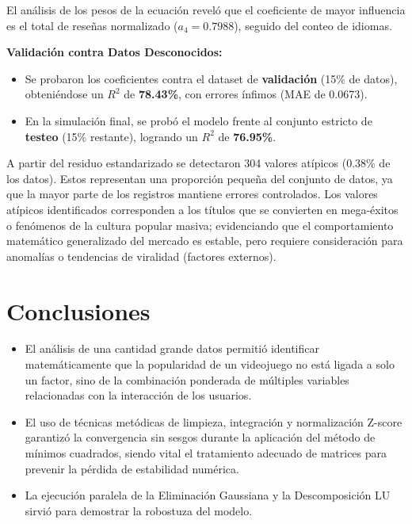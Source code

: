 \documentclass[12pt]{report}
\begin{document}
El análisis de los pesos de la ecuación reveló que el coeficiente de mayor influencia es el total de reseñas normalizado ($a_4 = 0.7988$), seguido del conteo de idiomas.

\textbf{Validación contra Datos Desconocidos:}
\begin{itemize}
    \item Se probaron los coeficientes contra el dataset de \textbf{validación} (15\% de datos), obteniéndose un $R^2$ de \textbf{78.43\%}, con errores ínfimos (MAE de 0.0673).
    \item En la simulación final, se probó el modelo frente al conjunto estricto de \textbf{testeo} (15\% restante), logrando un $R^2$ de \textbf{76.95\%}.
\end{itemize}

A partir del residuo estandarizado se detectaron 304 valores atípicos (0.38\% de los datos). Estos representan una proporción pequeña del conjunto de datos, ya que la mayor parte de los registros mantiene errores controlados. Los valores atípicos identificados corresponden a los títulos que se convierten en mega-éxitos o fenómenos de la cultura popular masiva; evidenciando que el comportamiento matemático generalizado del mercado es estable, pero requiere consideración para anomalías o tendencias de viralidad (factores externos).


\section*{Conclusiones}
\begin{itemize}
    \item El análisis de una cantidad grande datos permitió identificar matemáticamente que la popularidad de un videojuego no está ligada a solo un factor, sino de la combinación ponderada de múltiples variables relacionadas con la interacción de los usuarios.
    \item El uso de técnicas metódicas de limpieza, integración y normalización Z-score garantizó la convergencia sin sesgos durante la aplicación del método de mínimos cuadrados, siendo vital el tratamiento adecuado de matrices para prevenir la pérdida de estabilidad numérica.
    \item La ejecución paralela de la Eliminación Gaussiana y la Descomposición LU sirvió para demostrar la robostuza del modelo.
\end{itemize}
\end{document}
